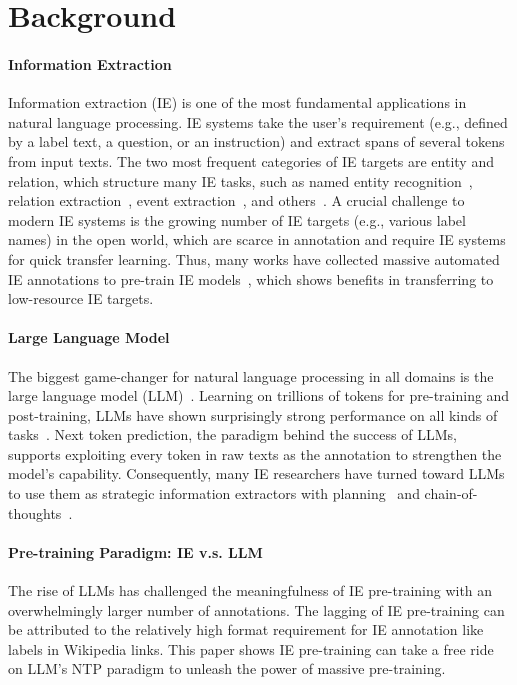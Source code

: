 \section{Background}

\paragraph{Information Extraction} Information extraction (IE) is one of the most fundamental applications in natural language processing. IE systems take the user's requirement (e.g., defined by a label text, a question, or an instruction) and extract spans of several tokens from input texts. The two most frequent categories of IE targets are entity and relation, which structure many IE tasks, such as named entity recognition~\cite{conll2003}, relation extraction~\cite{conll2004}, event extraction~\citep{ace2005multilingual}, and others~\citep{srl-task,DBLP:conf/semeval/PontikiGPPAM14,aste-task}. A crucial challenge to modern IE systems is the growing number of IE targets (e.g., various label names) in the open world, which are scarce in annotation and require IE systems for quick transfer learning. Thus, many works have collected massive automated IE annotations to pre-train IE models~\cite{fewnerd,multinerd,TadNER,NuNER,metaie}, which shows benefits in transferring to low-resource IE targets.

\paragraph{Large Language Model} The biggest game-changer for natural language processing in all domains is the large language model (LLM)~\citep{tulu,llama-2,achiam2023gpt4,olmo,dubey2024llama3,team2024gemma}. Learning on trillions of tokens for pre-training and post-training, LLMs have shown surprisingly strong performance on all kinds of tasks~\citep{achiam2023gpt4}. Next token prediction, the paradigm behind the success of LLMs, supports exploiting every token in raw texts as the annotation to strengthen the model's capability. Consequently, many IE researchers have turned toward LLMs~\citep{llm4clinicalie,gpt-ner,llm4ie} to use them as strategic information extractors with planning~\citep{LLM_Plan,LLM_NestNER} and chain-of-thoughts~\citep{chain_of_thoughts,cot_re}.

\paragraph{Pre-training Paradigm: IE v.s. LLM} The rise of LLMs has challenged the meaningfulness of IE pre-training with an overwhelmingly larger number of annotations. The lagging of IE pre-training can be attributed to the relatively high format requirement for IE annotation like labels in Wikipedia links. This paper shows IE pre-training can take a free ride on LLM's NTP paradigm to unleash the power of massive pre-training.